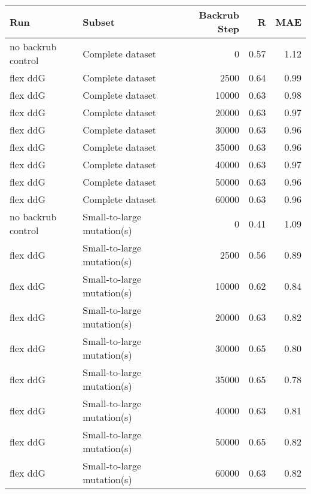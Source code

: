 \begin{table}
\begin{tabular}{llrrr}
\toprule
                Run &                               Subset &  Backrub Step &    R &  MAE \\
\midrule
 no backrub control &                     Complete dataset &             0 & 0.57 & 1.12 \\
           flex ddG &                     Complete dataset &          2500 & 0.64 & 0.99 \\
           flex ddG &                     Complete dataset &         10000 & 0.63 & 0.98 \\
           flex ddG &                     Complete dataset &         20000 & 0.63 & 0.97 \\
           flex ddG &                     Complete dataset &         30000 & 0.63 & 0.96 \\
           flex ddG &                     Complete dataset &         35000 & 0.63 & 0.96 \\
           flex ddG &                     Complete dataset &         40000 & 0.63 & 0.97 \\
           flex ddG &                     Complete dataset &         50000 & 0.63 & 0.96 \\
           flex ddG &                     Complete dataset &         60000 & 0.63 & 0.96 \\
 no backrub control &           Small-to-large mutation(s) &             0 & 0.41 & 1.09 \\
           flex ddG &           Small-to-large mutation(s) &          2500 & 0.56 & 0.89 \\
           flex ddG &           Small-to-large mutation(s) &         10000 & 0.62 & 0.84 \\
           flex ddG &           Small-to-large mutation(s) &         20000 & 0.63 & 0.82 \\
           flex ddG &           Small-to-large mutation(s) &         30000 & 0.65 & 0.80 \\
           flex ddG &           Small-to-large mutation(s) &         35000 & 0.65 & 0.78 \\
           flex ddG &           Small-to-large mutation(s) &         40000 & 0.63 & 0.81 \\
           flex ddG &           Small-to-large mutation(s) &         50000 & 0.65 & 0.82 \\
           flex ddG &           Small-to-large mutation(s) &         60000 & 0.63 & 0.82 \\

\end{tabular}
\end{table}
